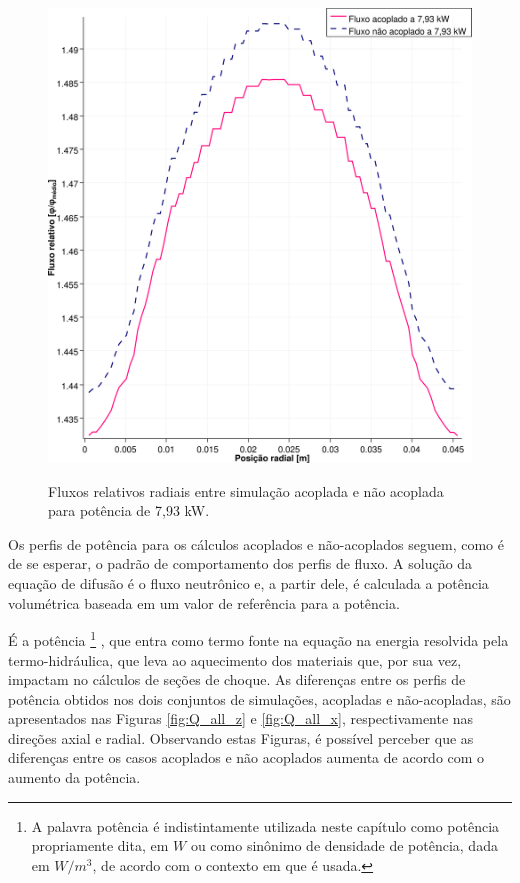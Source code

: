 \begin{figure}[htb]
  \caption{Fluxos relativos radiais entre simulação acoplada e não acoplada para
    potência de 7,93 kW.}
  \centering\includegraphics[scale=0.5]{figuras/Flux_rel_x_200_port.png}
  \label{fig:flux_x_200}
\end{figure}

Os perfis de potência para os cálculos acoplados e não-acoplados seguem, como
é de se esperar, o padrão de comportamento dos perfis de fluxo. A solução da
equação de difusão é o fluxo neutrônico e, a partir
dele, é calculada a potência volumétrica baseada em um valor de referência para
a potência.

É a potência
\footnote{A palavra potência é indistintamente utilizada neste capítulo como potência
  propriamente dita, em $W$ ou como sinônimo de densidade de potência, dada em $W/m^3$, de acordo
  com o contexto em que é usada.}
, que entra como termo fonte na equação na energia
resolvida pela termo-hidráulica, que leva ao aquecimento dos materiais que, por sua vez, impactam
no cálculos de seções de choque. As diferenças entre os perfis de potência obtidos nos dois conjuntos
de simulações, acopladas e não-acopladas, são apresentados nas Figuras \ref{fig:Q_all_z} e
\ref{fig:Q_all_x}, respectivamente nas direções axial e radial. Observando estas Figuras,
é possível perceber que as diferenças entre os casos acoplados e
não acoplados aumenta de acordo com o aumento da potência.

